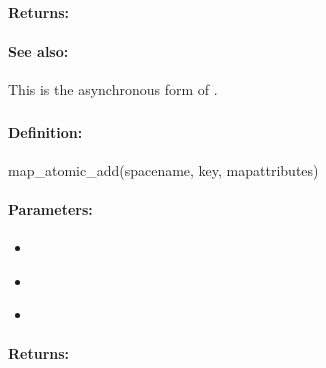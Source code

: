 \paragraph{Returns:}


\paragraph{See also:}  This is the asynchronous form of .

\pagebreak
\subsubsection{}
\label{api:ruby:map_atomic_add}


\paragraph{Definition:}
\begin{rubycode}
map_atomic_add(spacename, key, mapattributes)
\end{rubycode}

\paragraph{Parameters:}
\begin{itemize}[noitemsep]
\item {}\\

\item {}\\

\item {}\\

\end{itemize}

\paragraph{Returns:}


\pagebreak
\subsubsection{}
\label{api:ruby:async_map_atomic_add}


